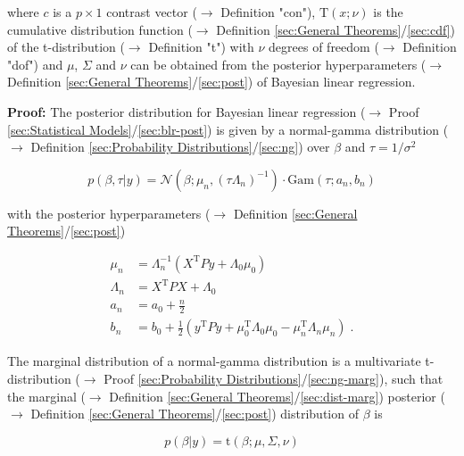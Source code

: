 \documentclass[a4paper,12pt,twoside]{book}
\begin{document}
where $c$ is a $p \times 1$ contrast vector ($\rightarrow$ Definition "con"), $\mathrm{T}(x; \nu)$ is the cumulative distribution function ($\rightarrow$ Definition \ref{sec:General Theorems}/\ref{sec:cdf}) of the t-distribution ($\rightarrow$ Definition "t") with $\nu$ degrees of freedom ($\rightarrow$ Definition "dof") and $\mu$, $\Sigma$ and $\nu$ can be obtained from the posterior hyperparameters ($\rightarrow$ Definition \ref{sec:General Theorems}/\ref{sec:post}) of Bayesian linear regression.


\vspace{1em}
\textbf{Proof:} The posterior distribution for Bayesian linear regression ($\rightarrow$ Proof \ref{sec:Statistical Models}/\ref{sec:blr-post}) is given by a normal-gamma distribution ($\rightarrow$ Definition \ref{sec:Probability Distributions}/\ref{sec:ng}) over $\beta$ and $\tau = 1/\sigma^2$

\begin{equation} \label{eq:blr-pp-GLM-NG-post}
p(\beta,\tau|y) = \mathcal{N}(\beta; \mu_n, (\tau \Lambda_n)^{-1}) \cdot \mathrm{Gam}(\tau; a_n, b_n)
\end{equation}

with the posterior hyperparameters ($\rightarrow$ Definition \ref{sec:General Theorems}/\ref{sec:post})

\begin{equation} \label{eq:blr-pp-GLM-NG-post-par}
\begin{split}
\mu_n &= \Lambda_n^{-1} (X^\mathrm{T} P y + \Lambda_0 \mu_0) \\
\Lambda_n &= X^\mathrm{T} P X + \Lambda_0 \\
a_n &= a_0 + \frac{n}{2} \\
b_n &= b_0 + \frac{1}{2} (y^\mathrm{T} P y + \mu_0^\mathrm{T} \Lambda_0 \mu_0 - \mu_n^\mathrm{T} \Lambda_n \mu_n) \; .
\end{split}
\end{equation}

The marginal distribution of a normal-gamma distribution is a multivariate t-distribution ($\rightarrow$ Proof \ref{sec:Probability Distributions}/\ref{sec:ng-marg}), such that the marginal ($\rightarrow$ Definition \ref{sec:General Theorems}/\ref{sec:dist-marg}) posterior ($\rightarrow$ Definition \ref{sec:General Theorems}/\ref{sec:post}) distribution of $\beta$ is

\begin{equation} \label{eq:blr-pp-GLM-NG-post-beta}
p(\beta|y) = \mathrm{t}(\beta; \mu, \Sigma, \nu)
\end{equation}
\end{document}
